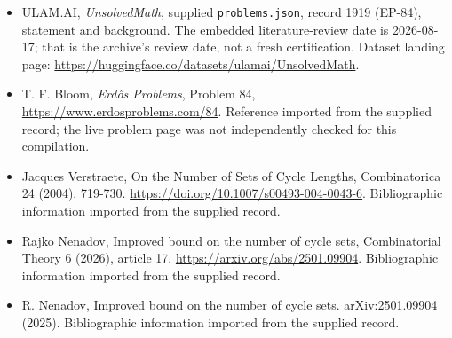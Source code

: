 \documentclass[11pt,a4paper]{article}
\begin{document}
{\small

\begin{itemize}

\item[\hypertarget{source:1919:1}{S1}] ULAM.AI, \emph{UnsolvedMath}, supplied \texttt{problems.json}, record 1919 (EP-84), statement and background. The embedded literature-review date is 2026-08-17; that is the archive’s review date, not a fresh certification. Dataset landing page: \url{https://huggingface.co/datasets/ulamai/UnsolvedMath}.

\item[\hypertarget{source:1919:2}{S2}] T. F. Bloom, \emph{Erdős Problems}, Problem 84, \url{https://www.erdosproblems.com/84}. Reference imported from the supplied record; the live problem page was not independently checked for this compilation.

\item[\hypertarget{source:1919:3}{S3}] Jacques Verstraete, On the Number of Sets of Cycle Lengths, Combinatorica 24 (2004), 719-730. \url{https://doi.org/10.1007/s00493-004-0043-6}. Bibliographic information imported from the supplied record.

\item[\hypertarget{source:1919:4}{S4}] Rajko Nenadov, Improved bound on the number of cycle sets, Combinatorial Theory 6 (2026), article 17. \url{https://arxiv.org/abs/2501.09904}. Bibliographic information imported from the supplied record.

\item[\hypertarget{source:1919:5}{S5}] R. Nenadov, Improved bound on the number of cycle sets. arXiv:2501.09904 (2025). Bibliographic information imported from the supplied record.

\end{itemize}

}

\label{end:1919}
\end{document}
